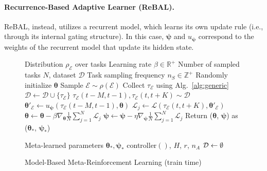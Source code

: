 \paragraph{Recurrence-Based Adaptive Learner (ReBAL).} ReBAL, instead, utilizes a recurrent model, which  learns its own update rule (i.e., through its internal gating structure). In this case, $\bm\psi$ and $u_{\bm\psi}$ correspond to the weights of the recurrent model that update its hidden state.
% 
\begin{figure}
\noindent
\begin{minipage}[t]{0.5\textwidth}
\begin{algorithm}[H]
\begin{algorithmic}[1]
 \REQUIRE Distribution $\rho_{\mathcal{E}}$ over tasks
 \REQUIRE Learning rate $\beta \in \mathbb{R}^+$
 \REQUIRE Number of sampled tasks $N$, dataset $\mathcal{D}$
 \REQUIRE Task sampling frequency $n_{S} \in \mathbb{Z}^{+}$
 \STATE Randomly initialize $\bm{\theta}$
\STATE Sample $\mathcal{E} \sim \rho(\mathcal{E})$
\STATE Collect $\tau_{\mathcal{E}}$ using Alg.~\ref{alg:generic}
\STATE $\mathcal{D} \leftarrow \mathcal{D} \cup \{\tau_{\mathcal{E}}\}$
\ENDIF
    \STATE $\tau_{\mathcal{E}}(t-M, t-1), \tau_{\mathcal{E}}(t, t+K) \sim \mathcal{D}$
    \STATE $\bm{\theta}'_{\mathcal{E}} \leftarrow u_{\bm{\psi}}(\tau_{\mathcal{E}}(t-M, t-1), \bm{\theta})$
    \STATE $\mathcal{L}_j  \leftarrow \mathcal{L} (\tau_{\mathcal{E}}(t, t+K), {\bm{\theta}'_{\mathcal{E}}})$
    \ENDFOR
    \STATE $\bm{\theta} \leftarrow \bm{\theta} - \beta \nabla_{\bm{\theta}} \frac{1}{N} \sum\limits_{j=1}^N \mathcal{L}_j$
    \STATE $\bm{\psi} \leftarrow \bm{\psi} - \eta \nabla_{\bm{\psi}}  \frac{1}{N} \sum\limits_{j=1}^N \mathcal{L}_j$
\ENDFOR
\STATE Return (${\bm{\theta}}$, $\bm{\psi}$) as (${\bm{\theta}_*}$, $\bm{\psi_*}$)
\end{algorithmic}
\caption{Model-Based Meta-Reinforcement Learning (train time)}
\label{alg:metatrain}
\end{algorithm}
\end{minipage}
\noindent
\hspace{0.1cm}
\begin{minipage}[t]{0.45\textwidth}
\noindent
\begin{algorithm}[H]
\begin{algorithmic}[1]
 \REQUIRE Meta-learned parameters $\bm{\theta}_*, \bm{\psi}_*$
 \REQUIRE controller$()$, $H$, $r$, $n_{A}$
\STATE $\mathcal{D} \leftarrow \emptyset $\\

\end{algorithmic}
\end{algorithm}
\end{minipage}
\end{figure}
